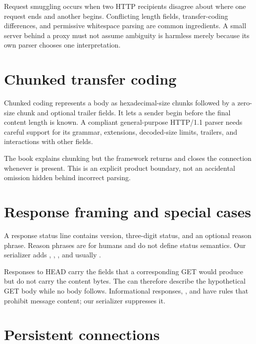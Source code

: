 \begin{securityboundary}
Request smuggling occurs when two HTTP recipients disagree about where one
request ends and another begins. Conflicting length fields, transfer-coding
differences, and permissive whitespace parsing are common ingredients. A small
server behind a proxy must not assume ambiguity is harmless merely because its
own parser chooses one interpretation.
\end{securityboundary}

\section{Chunked transfer coding}

Chunked coding represents a body as hexadecimal-size chunks followed by a
zero-size chunk and optional trailer fields. It lets a sender begin before the
final content length is known. A compliant general-purpose HTTP/1.1 parser needs
careful support for its grammar, extensions, decoded-size limits, trailers, and
interactions with other fields.

The book explains chunking but the framework returns 
and closes the connection whenever  is present. This is
an explicit product boundary, not an accidental omission hidden behind incorrect
parsing.

\section{Response framing and special cases}

A response status line contains version, three-digit status, and an optional
reason phrase. Reason phrases are for humans and do not define status semantics.
Our serializer adds , , , and usually
.

Responses to HEAD carry the fields that a corresponding GET would produce but
do not carry the content bytes. The  can therefore describe
the hypothetical GET body while no body follows. Informational responses,
, and  have rules that prohibit
message content; our serializer suppresses it.

\section{Persistent connections}

